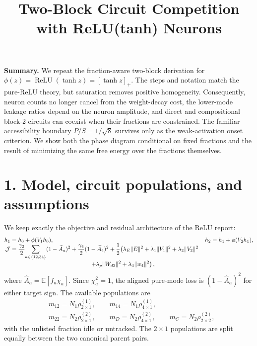 \documentclass[10pt]{article}
\title{\vspace{-1.3cm}\textbf{Two-Block Circuit Competition with ReLU(tanh) Neurons}}
\author{}
\date{\vspace{-1.15cm}}
\begin{document}
\maketitle
\vspace{-0.75cm}

\textbf{Summary.}
We repeat the fraction-aware two-block derivation for
$\phi(z)=\operatorname{ReLU}(\tanh z)=[\tanh z]_+$.  The steps and notation match the
pure-ReLU theory, but saturation removes positive homogeneity.  Consequently, neuron counts
no longer cancel from the weight-decay cost, the lower-mode leakage ratios depend on the
neuron amplitude, and direct and compositional block-2 circuits can coexist when their
fractions are constrained.  The familiar accessibility boundary $P/S=1/\sqrt8$ survives only
as the weak-activation onset criterion.  We show both the phase diagram conditional on fixed
fractions and the result of minimizing the same free energy over the fractions themselves.

\section*{1. Model, circuit populations, and assumptions}
We keep exactly the objective and residual architecture of the ReLU report:
\begin{align}
h_1&=h_0+\phi(V_1h_0),&h_2&=h_1+\phi(V_2h_1),\nonumber\\[-5pt]
\mathcal J&=\frac{\gamma_2}{2}\!\sum_{a\in\{12,34\}}(1-\widehat A_a)^2
+\frac{\gamma_4}{2}(1-\widehat A_4)^2
+\frac12\!\left(\lambda_E\|E\|^2+\lambda_1\|V_1\|^2+\lambda_2\|V_2\|^2\right.\nonumber\\[-2pt]
&\hspace{4.8cm}\left.+\lambda_p\|W_{d2}\|^2+\lambda_4\|w_4\|^2\right),
\label{eq:objective}
\end{align}
where $\widehat A_a=\mathbb E[f_a\chi_a]$.  Since $\chi_a^2=1$, the aligned pure-mode
loss is $(1-\widehat A_a)^2$ for either target sign.  The available populations are
\begin{align}
&m_{12}=N_1\rho^{(1)}_{2\times1},\qquad
m_{14}=N_1\rho^{(1)}_{4\times1},\nonumber\\[-2pt]
&m_{22}=N_2\rho^{(2)}_{2\times1},\qquad
m_D=N_2\rho^{(2)}_{4\times1},\qquad
m_C=N_2\rho^{(2)}_{2\times2},
\label{eq:counts}
\end{align}
with the unlisted fraction idle or untracked.  The $2\times1$ populations are split equally
between the two canonical parent pairs.
\end{document}
